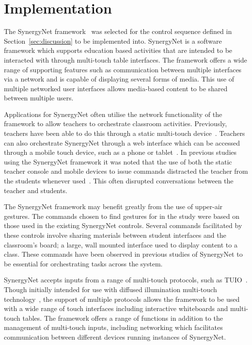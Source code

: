 \documentclass[manuscript, review, screen]{acmart}
\begin{document}

\section{Implementation}
\label{sec:implementation}

The SynergyNet framework~\cite{Higgins2011} was selected for the control sequence defined in Section~\ref{sec:discussion} to be implemented into.
SynergyNet is a software framework which supports education based activities that are intended to be interacted with through multi-touch table interfaces.
The framework offers a wide range of supporting features such as communication between multiple interfaces via a network and is capable of displaying several forms of media.
This use of multiple networked user interfaces allows media-based content to be shared between multiple users.

Applications for SynergyNet often utilise the network functionality of the framework to allow teachers to orchestrate classroom activities.
Previously, teachers have been able to do this through a static multi-touch device~\cite{AlAgha2010}.
Teachers can also orchestrate SynergyNet through a web interface which can be accessed through a mobile touch device, such as a phone or tablet~\cite{Mercier2013}.
In previous studies using the SynergyNet framework it was noted that the use of both the static teacher console and mobile devices to issue commands distracted the teacher from the students whenever used~\cite{Hatch2011,Mercier2013}.
This often disrupted conversations between the teacher and students.  

The SynergyNet framework may benefit greatly from the use of upper-air gestures. 
The commands chosen to find gestures for in the study were based on those used in the existing SynergyNet controls. 
Several commands facilitated by these controls involve sharing materials between student interfaces and the classroom's board; a large, wall mounted interface used to display content to a class.
These commands have been observed in previous studies of SynergyNet to be essential for orchestrating tasks across the system.

SynergyNet accepts inputs from a range of multi-touch protocols, such as TUIO~\cite{Kaltenbrunner2009}.
Though initially intended for use with diffused illumination multi-touch technology~\cite{Matsushita1997}, the support of multiple protocols allows the framework to be used with a wide range of touch interfaces including interactive whiteboards and multi-touch tables.
The framework offers a range of functions in addition to the management of multi-touch inputs, including networking which facilitates communication between different devices running instances of SynergyNet.
\end{document}
